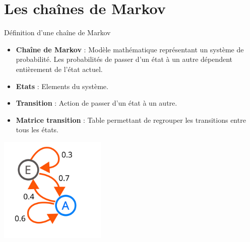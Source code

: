 \section{Les chaînes de Markov}


\begin{frame}{Définition d'une chaîne de Markov}
	\begin{itemize}
		\item \textbf{Chaîne de Markov} : Modèle mathématique représentant un système de probabilité. Les probabilités de passer d'un état à un autre dépendent entièrement de l'état actuel.
		\item \textbf{Etats} : Elements du système.
		\item \textbf{Transition} : Action de passer d'un état à un autre.
		\item \textbf{Matrice transition} : Table permettant de regrouper les transitions entre tous les états.
	\end{itemize}
	\begin{center}
		\includegraphics[width=0.38\textwidth]{images/def_markov.png}
		\vspace*{0.3cm}
	\end{center}

\end{frame}

